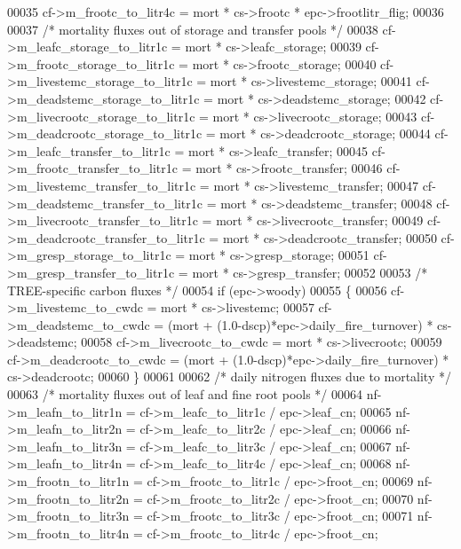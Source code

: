 \begin{DoxyCode}
00035     cf->m\_frootc\_to\_litr4c = mort * cs->frootc * epc->frootlitr\_flig;
00036     
00037     \textcolor{comment}{/* mortality fluxes out of storage and transfer pools */}
00038     cf->m\_leafc\_storage\_to\_litr1c  = mort * cs->leafc\_storage;
00039     cf->m\_frootc\_storage\_to\_litr1c  = mort * cs->frootc\_storage;
00040     cf->m\_livestemc\_storage\_to\_litr1c  = mort * cs->livestemc\_storage;
00041     cf->m\_deadstemc\_storage\_to\_litr1c  = mort * cs->deadstemc\_storage;
00042     cf->m\_livecrootc\_storage\_to\_litr1c  = mort * cs->livecrootc\_storage;
00043     cf->m\_deadcrootc\_storage\_to\_litr1c  = mort * cs->deadcrootc\_storage;
00044     cf->m\_leafc\_transfer\_to\_litr1c = mort * cs->leafc\_transfer;
00045     cf->m\_frootc\_transfer\_to\_litr1c = mort * cs->frootc\_transfer;
00046     cf->m\_livestemc\_transfer\_to\_litr1c = mort * cs->livestemc\_transfer;
00047     cf->m\_deadstemc\_transfer\_to\_litr1c = mort * cs->deadstemc\_transfer;
00048     cf->m\_livecrootc\_transfer\_to\_litr1c = mort * cs->livecrootc\_transfer;
00049     cf->m\_deadcrootc\_transfer\_to\_litr1c = mort * cs->deadcrootc\_transfer;
00050     cf->m\_gresp\_storage\_to\_litr1c = mort * cs->gresp\_storage;
00051     cf->m\_gresp\_transfer\_to\_litr1c = mort * cs->gresp\_transfer;
00052 
00053     \textcolor{comment}{/* TREE-specific carbon fluxes */}
00054     \textcolor{keywordflow}{if} (epc->woody)
00055     \{
00056         cf->m\_livestemc\_to\_cwdc = mort * cs->livestemc;  
00057         cf->m\_deadstemc\_to\_cwdc = (mort + (1.0-dscp)*epc->daily\_fire\_turnover) * cs->deadstemc;  
00058         cf->m\_livecrootc\_to\_cwdc = mort * cs->livecrootc;   
00059         cf->m\_deadcrootc\_to\_cwdc = (mort + (1.0-dscp)*epc->daily\_fire\_turnover) * cs->deadcrootc; 
00060     \}
00061     
00062     \textcolor{comment}{/* daily nitrogen fluxes due to mortality */}
00063     \textcolor{comment}{/* mortality fluxes out of leaf and fine root pools */}
00064     nf->m\_leafn\_to\_litr1n = cf->m\_leafc\_to\_litr1c / epc->leaf\_cn;   
00065     nf->m\_leafn\_to\_litr2n = cf->m\_leafc\_to\_litr2c / epc->leaf\_cn;   
00066     nf->m\_leafn\_to\_litr3n = cf->m\_leafc\_to\_litr3c / epc->leaf\_cn;   
00067     nf->m\_leafn\_to\_litr4n = cf->m\_leafc\_to\_litr4c / epc->leaf\_cn;   
00068     nf->m\_frootn\_to\_litr1n = cf->m\_frootc\_to\_litr1c / epc->froot\_cn;    
00069     nf->m\_frootn\_to\_litr2n = cf->m\_frootc\_to\_litr2c / epc->froot\_cn;    
00070     nf->m\_frootn\_to\_litr3n = cf->m\_frootc\_to\_litr3c / epc->froot\_cn;    
00071     nf->m\_frootn\_to\_litr4n = cf->m\_frootc\_to\_litr4c / epc->froot\_cn;    

\end{DoxyCode}

